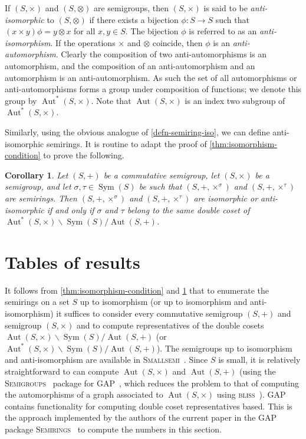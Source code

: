 \documentclass{article}
\theoremstyle{definition}
\theoremstyle{plain}
\newtheorem{cor}[defn]{Corollary}
\newcommand{\GAP}{\textsc{GAP}~\cite{GAP4}\xspace}
\newcommand{\Smallsemi}{\textsc{Smallsemi}~\cite{Smallsemi}\xspace}
\newcommand{\Semigroups}{\textsc{Semigroups}~\cite{Semigroups}\xspace}
\newcommand{\Semirings}{\textsc{Semirings}~\cite{Semirings}\xspace}
\newcommand{\bliss}{\textsc{bliss}~\cite{bliss, junttila2007}\xspace}
\newcommand{\Sym}{\operatorname{Sym}}
\newcommand{\Aut}{\operatorname{Aut}}
\begin{document}
If $(S, \times)$ and $(S, \otimes)$ are semigroups, then $(S, \times)$ is said
to be \textit{anti-isomorphic} to $(S, \otimes)$ if there exists a bijection
$\phi: S \to S$ such that $(x\times y)\phi = y\otimes x$ for all $x, y\in S$.
The bijection $\phi$ is referred to as an \textit{anti-isomorphism}. If the
operations $\times$ and $\otimes$ coincide, then $\phi$ is an
\textit{anti-automorphism}. Clearly the composition of two anti-automorphisms
is an automorphism, and the composition of an anti-automorphism and an
automorphism is an anti-automorphism. As such the set of all automorphisms or
anti-automorphisms forms a group under composition of functions; we denote this
group by $\Aut^*(S, \times)$. Note that $\Aut(S, \times)$ is an index two
subgroup of $\Aut^*(S, \times)$.

Similarly, using the obvious analogue of \cref{defn-semiring-iso}, we can
define anti-isomorphic semirings. It is routine to adapt the proof of
\cref{thm:isomorphism-condition} to prove the following.

\begin{cor}
  \label{cor:equiv-condition}
  Let \((S, +)\) be a commutative semigroup, let \((S, \times)\) be a
  semigroup, and let \(\sigma, \tau\in\Sym(S)\) be such that $(S, +, \times ^
  \sigma)$ and $(S, +, \times ^ \tau)$ are semirings. Then \((S, +, \times ^
  \sigma)\) and \((S, +, \times^\tau)\) are isomorphic or anti-isomorphic if
  and only if \(\sigma\) and \(\tau\) belong to the same double coset of
  \(\Aut^*(S, \times) \backslash \Sym(S) / \Aut(S, +)\).
\end{cor}

\section{Tables of results}

It follows from \cref{thm:isomorphism-condition} and \cref{cor:equiv-condition}
that to enumerate the semirings on a set $S$ up to isomorphism (or up to
isomorphism and anti-isomorphism) it suffices to consider every commutative
semigroup $(S, +)$ and semigroup $(S, \times)$ and to compute representatives
of the double cosets \(\Aut(S, \times) \backslash \Sym(S) / \Aut(S, +)\) (or
\(\Aut^*(S, \times) \backslash \Sym(S) / \Aut(S, +)\)). The semigroups up to
isomorphism and anti-isomorphism are available in \Smallsemi.  Since $S$ is
small, it is relatively straightforward to can compute $\Aut(S, \times)$ and
$\Aut(S, +)$ (using the \Semigroups package for \GAP, which reduces
  the problem to that of computing the automorphisms of a graph
associated to $\Aut(S, \times)$ using \bliss). \GAP contains
functionality for computing double coset
representatives based. %
This is the approach implemented by the authors of the current paper in the
\GAP package \Semirings to compute the numbers in this section.
\end{document}
